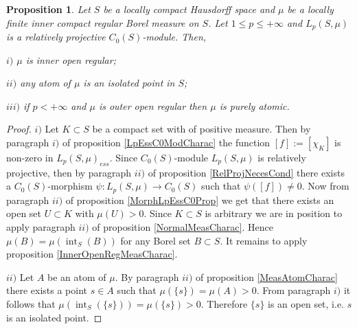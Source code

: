 \documentclass[12pt]{article}
\newtheorem{proposition}[theorem]{Proposition}
\begin{document}
\begin{proposition}\label{LpC0ModNecessCond} Let $S$ be a locally compact Hausdorff space and $\mu$ be a locally finite inner compact regular Borel measure on $S$. Let $1\leq p\leq +\infty$ and $L_p(S,\mu)$ is a relatively projective $C_0(S)$-module. Then,

    $i)$ $\mu$ is inner open regular;

    $ii)$ any atom of $\mu$ is an isolated point in $S$;

    $iii)$ if $p<+\infty$ and $\mu$ is outer open regular then $\mu$ is purely atomic.
\end{proposition}
\begin{proof} $i)$ Let $K\subset S$ be a compact set with of positive measure. Then by paragraph $i)$ of proposition \ref{LpEssC0ModCharac} the function $[f]:=[\chi_K]$ is non-zero in $L_p(S,\mu)_{ess}$. Since $C_0(S)$-module $L_p(S,\mu)$ is relatively projective, then by paragraph $ii)$ of proposition \ref{RelProjNecesCond} there exists a $C_0(S)$-morphism $\psi:L_p(S,\mu)\to C_0(S)$ such that $\psi([f])\neq 0$. Now from paragraph $ii)$ of proposition \ref{MorphLpEssC0Prop} we get that there exists an open set $U\subset K$ with $\mu(U)>0$. Since $K\subset S$ is arbitrary we are in position to apply paragraph $ii)$ of proposition \ref{NormalMeasCharac}. Hence $\mu(B)=\mu(\operatorname{int}_S(B))$ for any Borel set $B\subset S$. It remains to apply proposition \ref{InnerOpenRegMeasCharac}.

    $ii)$ Let $A$ be an atom of $\mu$. By paragraph $ii)$ of proposition \ref{MeasAtomCharac} there exists a point $s\in A$ such that $\mu(\{s\})=\mu(A)>0$. From paragraph $i)$ it follows that $\mu(\operatorname{int}_S(\{s\}))=\mu(\{s\})>0$. Therefore $\{s\}$ is an open set, i.e. $s$ is an isolated point.


\end{proof}
\end{document}
